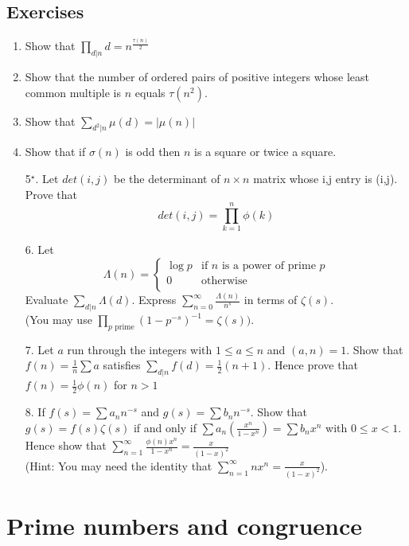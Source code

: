 \subsection{Exercises}
\begin{enumerate}
\item Show that $\prod_{d|n}d = n^{\frac{\tau(n)}{2}}$
\item Show that the number of ordered pairs of positive integers whose least common multiple is $n$ equals $\tau(n^2)$.
\item Show that $\sum_{d^2|n}\mu(d)=|\mu(n)|$
\item Show that if $\sigma(n)$ is odd then $n$ is a square or twice a square.
\item[5$^\star$.] Let $det(i,j)$ be the determinant of $n \times n$ matrix whose i,j entry is (i,j). Prove that
\begin{equation*} det(i,j)=\prod_{k=1}^{n}\phi(k) \end{equation*}
\item[6.] Let
\begin{equation*}
\Lambda(n)= \left\{
\begin{array}{ll}
\log{p} & \text{if } n \text{ is a power of prime }p \\
0 & \text{otherwise } \\
\end{array} \right.
\end{equation*}
Evaluate $\sum_{d|n}\Lambda(d)$. Express $\sum_{n=0}^{\infty}\frac{\Lambda(n)}{n^s}$ in terms of $\zeta(s)$.\\
(You may use $\prod_{p \text{ prime}}(1-p^{-s})^{-1} = \zeta(s))$.\\
\item[7.] Let $a$ run through the integers with $1 \le a \le n$ and $(a,n)=1$. Show that $f(n)=\frac{1}{n} \sum a$ satisfies $\sum_{d|n}f(d)=\frac{1}{2}(n+1)$. Hence prove that $f(n)=\frac{1}{2} \phi(n)$ for $n>1$
\item[8.] If $f(s)=\sum a_n n^{-s}$ and $g(s)=\sum b_n n^{-s}$. Show that $g(s)=f(s)\zeta(s)$ if and only if $\sum a_n \left(\frac{x^n}{1-x^n}\right)=\sum b_n x^n$ with $0 \le x <1$. Hence show that $\sum_{n=1}^{\infty}\frac{\phi(n)x^n}{1-x^n}=\frac{x}{(1-x)^2}$\\
(Hint: You may need the identity that $\sum_{n=1}^{\infty}nx^n =  \frac{x}{(1-x)^2}$).
\end{enumerate}

\section{Prime numbers and congruence}
